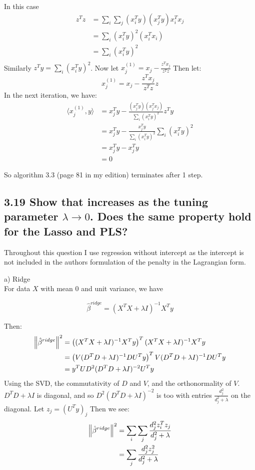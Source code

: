 In this case 
\begin{align*}
    z^T z &= \sum_i \sum_j \left(x_i^T y\right)\left(x_j^T y\right) x_i^T x_j\\
    &= \sum_i \left(x_i^T y\right)^2 \left(x_i^T x_i\right)\\
    &= \sum_i \left(x_i^T y\right)^2\\
\end{align*}
Similarly $z^T y = \sum_i \left(x_i^T y\right)^2$. Now let $x_j^{(1)} = x_j - \frac{z^T x_j}{z^T z}$
Then let:
$$ x_j^{(1)} = x_j - \frac{z^T x_j}{ z^T z}z$$
In the next iteration, we have:
\begin{align*}
    \langle x_j^{(1)}, y\rangle &= x_j^T y - \frac{\left(x_j^T y\right) \left(x_j^T x_j\right)}{ \sum_i \left(x_i^T y\right)^2}z^T y\\
     &= x_j^T y - \frac{x_j^T y }{ \sum_i \left(x_i^T y\right)^2 }\sum_i \left(x_i^T y\right)^2\\
    &= x_j^T y - x_j^T y\\
    &= 0
\end{align*}

So algorithm 3.3 (page 81 in my edition) terminates after 1 step.

\subsection*{3.19 Show that  increases as the tuning parameter $\lambda \rightarrow 0$. Does the same property hold for the Lasso and PLS?}

Throughout this question I use regression without intercept as the intercept is not included in the authors formulation of the penalty in the Lagrangian form.

a) Ridge\\
For data $X$ with mean 0 and unit variance, we have

$$\hat{\beta}^{ridge} = (X^TX + \lambda I)^{-1}X^T y$$

Then:
\begin{align*}
     \left\lVert\hat{\beta}^{ridge}\right\rVert^2 &= \left((X^TX + \lambda I)^{-1}X^T y\right)^T (X^TX + \lambda I)^{-1}X^T y \\
     &= \left(V (D^TD + \lambda I)^{-1}D U^T y\right)^T V(D^T D + \lambda I)^{-1} D U^T y \\
     &= y^T U D^2 (D^T D + \lambda I)^{-2} U^T y
\end{align*}
Using the SVD, the commutativity of $D$ and $V$, and the orthonormality of $V$.
$D^T D + \lambda I$ is diagonal, and so $D^2 (D^T D + \lambda I)^{-2}$ is too with entries $\frac{d_j^2}{d_j^2 + \lambda}$ on the diagonal.
Let $z_j = (U^T y)_j$
Then we see:
\begin{align*}
\left\lVert\hat{\beta}^{ridge}\right\rVert^2 &= \sum_i \sum_j \frac{d_j^2 z_i^T z_j}{d_j^2 + \lambda}\\
&= \sum_j \frac{d_j^2 z_j^2}{d_j^2 + \lambda}\\
\end{align*} 

